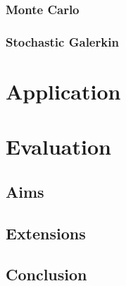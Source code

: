\documentclass{article}
\numberwithin{equation}{section}
\begin{document}
\subsubsection{Monte Carlo}

\subsubsection{Stochastic Galerkin}

\newpage

\section{Application}

\newpage

\section{Evaluation}

\subsection{Aims}

\subsection{Extensions}

\subsection{Conclusion}

\newpage



\end{document}
